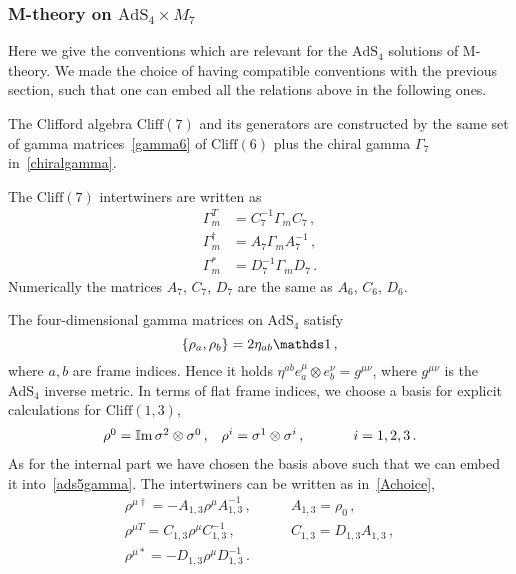 \documentclass[debug]{phd}
\begin{document}
\subsubsection{\texorpdfstring{M-theory on $\mathrm{AdS}_4 \times M_7$}{M-theory on on AdS4 x M7}}
Here we give the conventions which are relevant for the $\mathrm{AdS}_4$ solutions of M-theory. We made the choice of having compatible conventions with the previous section, such that one can embed all the relations above in the following ones.

The Clifford algebra $\mathrm{Cliff}(7)$ and its generators are constructed by the same set of gamma matrices~\eqref{gamma6} of $\mathrm{Cliff}(6)$ 
plus the chiral gamma $\Gamma_7$ in~\eqref{chiralgamma}.


The $\mathrm{Cliff}(7)$ intertwiners are written as
\begin{align*}
	\Gamma_m^T &= C_7^{-1} \Gamma_m C_{7}\, , \\[1mm]
	\Gamma_m^\dagger &= A_7 \Gamma_m A_7^{-1}\, , \\[1mm]
	\Gamma_m^* &= D_7^{-1} \Gamma_m D_7\, .
\end{align*}
%
Numerically the matrices $A_7$, $C_7$, $D_7$ are the same as $A_6$, $C_6$, $D_6$.

The four-dimensional gamma matrices on $\mathrm{AdS}_4$ satisfy 
\begin{equation}
	\{\rho_a , \rho_b \} = 2 \eta_{ab}\id \, ,
\end{equation}
where $a, b$ are frame indices. Hence it holds $\eta^{ab}e^\mu_a \otimes e^\nu_b = g^{\mu\nu}$, where $g^{\mu\nu}$ is the $\mathrm{AdS}_4$ inverse metric. 
In terms of flat frame indices, we choose a basis for explicit calculations for $\mathrm{Cliff}(1,3)$,
\begin{equation}
\begin{array}{lrcc}
	\rho^0=\IIm \sigma^2 \otimes \sigma^0\, , & \rho^i = \sigma^1 \otimes \sigma^i\, , &\phantom{\mbox{and}} & i=1,2,3 \, . 
\end{array}
\end{equation}
As for the internal part we have chosen the basis above such that we can embed it into~\eqref{ads5gamma}.
The intertwiners can be written as in~\eqref{Achoice},
\begin{equation}
	\begin{array}{ccc}
		\rho^{\mu\dagger} = -A_{1,3} \rho^\mu A_{1,3}^{-1}\, , &\phantom{\mbox{for}} &A_{1,3} = \rho_0\, , \\[1mm]
		\rho^{\mu T} = C_{1,3} \rho^\mu C_{1,3}^{-1}\, , &\phantom{\mbox{for}} & C_{1,3} = D_{1,3} A_{1,3} \, , \\[1mm]
		\rho^{\mu *} = -D_{1,3} \rho^\mu D_{1,3}^{-1}\, . & \phantom{\mbox{for}} & 
	\end{array}
\end{equation}

\end{document}
